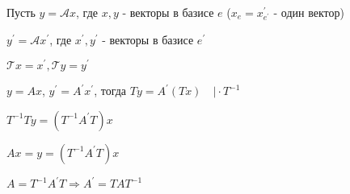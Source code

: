 \documentclass[12pt]{article}
\begin{document}
    \begin{MyProof}
        Пусть $y = \mathcal{A}x$, где $x, y$ - векторы в базисе $e$ ($x_e = x^\prime_{e^\prime}$ - один вектор)

        $y^\prime = \mathcal{A} x^\prime$, где $x^\prime, y^\prime$ - векторы в базисе $e^\prime$

        $\mathcal{T}x = x^\prime, \mathcal{T}y = y^\prime$

        $y = Ax$, $y^\prime = A^\prime x^\prime$, тогда $Ty = A^\prime (Tx) \quad \Big| \cdot T^{-1}$

        $T^{-1}Ty = (T^{-1}A^\prime T)x$
        
        $Ax = y = (T^{-1}A^\prime T)x$

        $A = T^{-1}A^\prime T \Longrightarrow A^\prime = TA T^{-1}$
    \end{MyProof}
\end{document}
